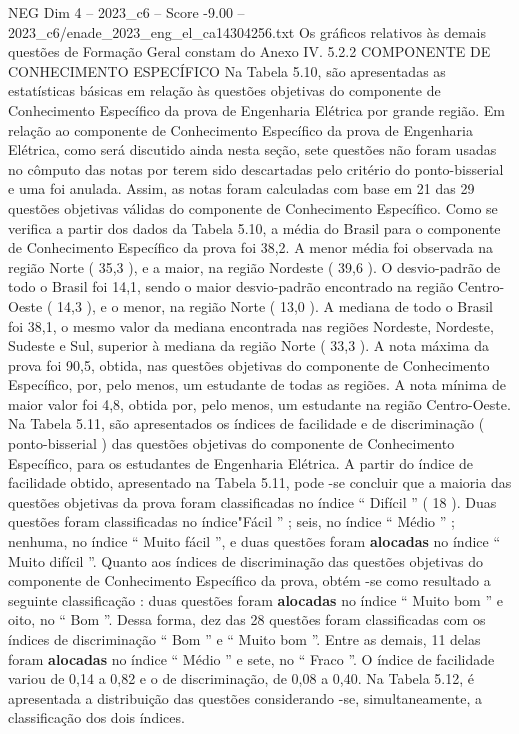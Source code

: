 \begin{textsample}{NEG Dim 4 – 2023\_c6 – Score -9.00 – 2023\_c6/enade\_2023\_eng\_el\_ca14304256.txt}
Os gráficos relativos às demais questões de Formação Geral constam do Anexo IV. 5.2.2 COMPONENTE DE CONHECIMENTO ESPECÍFICO Na Tabela 5.10, são apresentadas as estatísticas básicas em relação às questões objetivas do componente de Conhecimento Específico da prova de Engenharia Elétrica por grande região.
Em relação ao componente de Conhecimento Específico da prova de Engenharia Elétrica, como será discutido ainda nesta seção, sete questões não foram usadas no cômputo das notas por terem sido descartadas pelo critério do ponto-bisserial e uma foi anulada.
Assim, as notas foram calculadas com base em 21 das 29 questões objetivas válidas do componente de Conhecimento Específico.
Como se verifica a partir dos dados da Tabela 5.10, a média do Brasil para o componente de Conhecimento Específico da prova foi 38,2.
A menor média foi observada na região Norte ( 35,3 ), e a maior, na região Nordeste ( 39,6 ).
O desvio-padrão de todo o Brasil foi 14,1, sendo o maior desvio-padrão encontrado na região Centro-Oeste ( 14,3 ), e o menor, na região Norte ( 13,0 ).
A mediana de todo o Brasil foi 38,1, o mesmo valor da mediana encontrada nas regiões Nordeste, Nordeste, Sudeste e Sul, superior à mediana da região Norte ( 33,3 ).
A nota máxima da prova foi 90,5, obtida, nas questões objetivas do componente de Conhecimento Específico, por, pelo menos, um estudante de todas as regiões.
A nota mínima de maior valor foi 4,8, obtida por, pelo menos, um estudante na região Centro-Oeste.
Na Tabela 5.11, são apresentados os índices de facilidade e de discriminação ( ponto-bisserial ) das questões objetivas do componente de Conhecimento Específico, para os estudantes de Engenharia Elétrica.
A partir do índice de facilidade obtido, apresentado na Tabela 5.11, pode -se concluir que a maioria das questões objetivas da prova foram classificadas no índice “ Difícil ” ( 18 ).
Duas questões foram classificadas no índice"Fácil ” ; seis, no índice “ Médio ” ; nenhuma, no índice “ Muito fácil ”, e duas questões foram \textbf{alocadas} no índice “ Muito difícil ”.
Quanto aos índices de discriminação das questões objetivas do componente de Conhecimento Específico da prova, obtém -se como resultado a seguinte classificação : duas questões foram \textbf{alocadas} no índice “ Muito bom ” e oito, no “ Bom ”.
Dessa forma, dez das 28 questões foram classificadas com os índices de discriminação “ Bom ” e “ Muito bom ”.
Entre as demais, 11 delas foram \textbf{alocadas} no índice “ Médio ” e sete, no “ Fraco ”.
O índice de facilidade variou de 0,14 a 0,82 e o de discriminação, de 0,08 a 0,40.
Na Tabela 5.12, é apresentada a distribuição das questões considerando -se, simultaneamente, a classificação dos dois índices.

\end{textsample}
